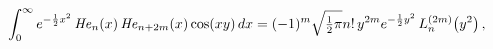 \[\int_{0}^{\infty}e^{-\frac{1}{2}x^{2}}\mathop{\mathit{He}_{n}\/}\nolimits\!%
\left(x\right)\mathop{\mathit{He}_{n+2m}\/}\nolimits\!\left(x\right)\mathop{%
\cos\/}\nolimits\!\left(xy\right)dx=(-1)^{m}\sqrt{\tfrac{1}{2}\pi}n!\,y^{2m}e^%
{-\frac{1}{2}y^{2}}\mathop{L^{(2m)}_{n}\/}\nolimits\!\left(y^{2}\right),\]